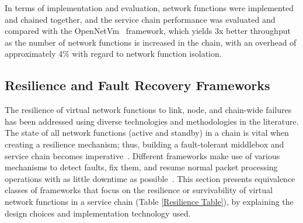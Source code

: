 \documentclass[futureinternet,review,accept,pdftex,moreauthors]{Definitions/mdpi}
\begin{document}
In terms of implementation and evaluation, network functions were implemented and chained together, and the service chain performance was evaluated and compared with the OpenNetVm~\cite{zhang2016opennetvm} framework, which yields 3x better throughput as the number of network functions is increased in the chain, with an overhead of approximately 4\% with regard to network function isolation. 




\subsection{Resilience and Fault Recovery Frameworks}
\label{SFC resilience frameworks}
The resilience of virtual network functions to link, node, and chain-wide failures has been addressed using diverse technologies and methodologies in the literature. The state of all network functions (active and standby) in a chain is vital when creating a resilience mechanism; thus, building a fault-tolerant middlebox and service chain becomes imperative~\cite{ghaznavi2020fault}. Different frameworks make use of various mechanisms to detect faults, fix them, and resume normal packet processing operations with as little downtime as possible~\cite{wang2021ddqp}. This section presents equivalence classes of frameworks that focus on the resilience or survivability of virtual network functions in a service chain (Table \ref{Resilience Table}), by explaining the design choices and implementation technology used.
\end{document}
